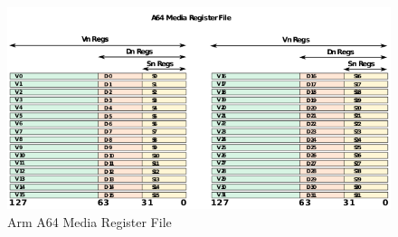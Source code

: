 \documentclass[12pt]{article}
\begin{document}
\begin{figure}[H]
\begin{center}
\includegraphics[width=1\linewidth]{imgs/a64media.png}
\caption{Arm A64 Media Register File}
\label{a64media}
\end{center}
\end{figure}




\end{document}
